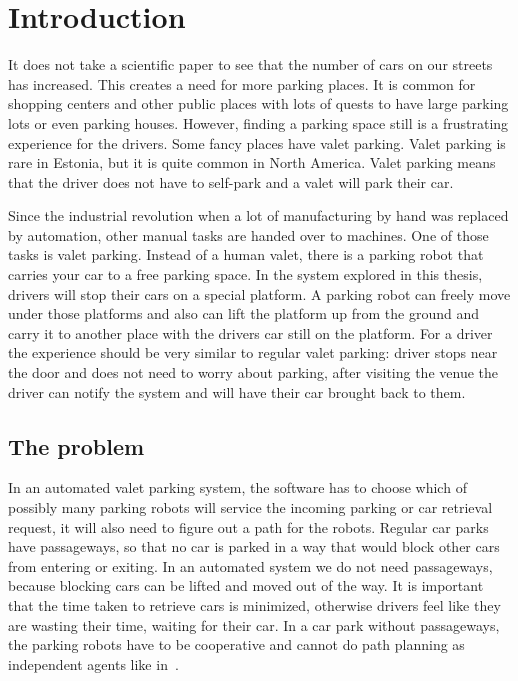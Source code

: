 \section{Introduction}
It does not take a scientific paper to see that the number of cars on our
streets has increased. This creates a need for more parking places. It is
common for shopping centers and other public places with lots of quests to have
large parking lots or even parking houses. However, finding a parking space
still is a frustrating experience for the drivers. Some fancy places have valet
parking. Valet parking is rare in Estonia, but it is quite common in North
America. Valet parking means that the driver does not have to self-park and a
valet will park their car.

Since the industrial revolution when a lot of manufacturing by hand was replaced
by automation, other manual tasks are handed over to machines. One of those
tasks is valet parking. Instead of a human valet, there is a parking robot that
carries your car to a free parking space. In the system explored in this
thesis, drivers will stop their cars on a special platform. A parking robot can
freely move under those platforms and also can lift the platform up from the
ground and carry it to another place with the drivers car still on the
platform. For a driver the experience should be very similar to regular valet
parking: driver stops near the door and does not need to worry about parking,
after visiting the venue the driver can notify the system and will have their
car brought back to them.
\subsection{The problem}
In an automated valet parking system, the software has to choose which of
possibly many parking robots will service the incoming parking or car retrieval
request, it will also need to figure out a path for the robots. Regular car
parks have passageways, so that no car is parked in a way that would block
other cars from entering or exiting. In an automated system we do not need
passageways, because blocking cars can be lifted and moved out of the way.
It is important that the time taken to retrieve cars is minimized, otherwise
drivers feel like they are wasting their time, waiting for their car. In a car
park without passageways, the parking robots have to be cooperative and cannot
do path planning as independent agents like in~\cite{wurman2008coordinating}.


